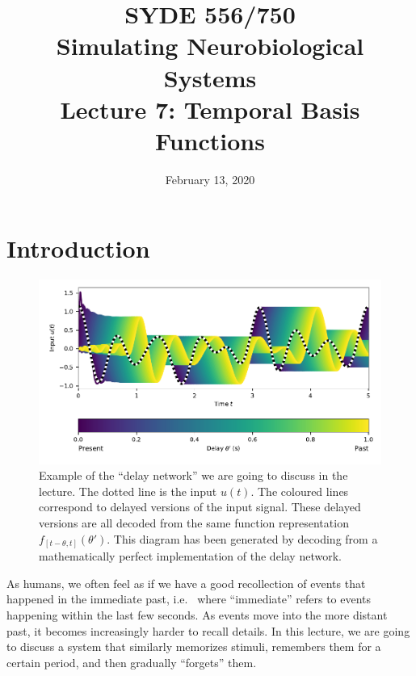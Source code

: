 \documentclass[10pt,letterpaper,oneside]{article}
\date{February 13, 2020}
\title{SYDE 556/750 \\ Simulating Neurobiological Systems \\ Lecture 7: Temporal Basis Functions}
\begin{document}

\section{Introduction}

\begin{figure}[h]
	\centering
	\includegraphics{media/delay_network_decoding.pdf}
	\caption{Example of the \enquote{delay network} we are going to discuss in the lecture. The dotted line is the input $u(t)$. The coloured lines correspond to delayed versions of the input signal. These delayed versions are all decoded from the same function representation $f_{[t - \theta, t]}(\theta')$. This diagram has been generated by decoding from a mathematically perfect implementation of the delay network. }
\end{figure}


As humans, we often feel as if we have a good recollection of events that happened in the immediate past, i.e.~ where \enquote{immediate} refers to events happening within the last few seconds. As events move into the more distant past, it becomes increasingly harder to recall details. In this lecture, we are going to discuss a system that similarly memorizes stimuli, remembers them for a certain period, and then gradually \enquote{forgets} them.
\end{document}
